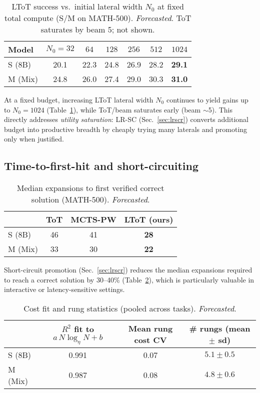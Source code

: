 \documentclass{article}
\begin{document}
\begin{table}[t]
\centering
\caption{LToT success vs.\ initial lateral width $N_0$ at fixed total compute (S/M on MATH-500). \emph{Forecasted}. ToT saturates by beam 5; not shown.}
\vspace{0.3em}
\begin{tabular}{lcccccc}
\toprule
\textbf{Model} & $N_0{=}32$ & $64$ & $128$ & $256$ & $512$ & $1024$ \\
\midrule
S (8B)   & 20.1 & 22.3 & 24.8 & 26.9 & 28.2 & \textbf{29.1} \\
M (Mix)  & 24.8 & 26.0 & 27.4 & 29.0 & 30.3 & \textbf{31.0} \\
\bottomrule
\end{tabular}
\label{tab:width-scaling}
\end{table}

At a fixed budget, increasing LToT lateral width $N_0$ continues to yield gains up to $N_0{=}1024$ (Table~\ref{tab:width-scaling}), while ToT/beam saturates early (beam $\sim$5).
This directly addresses \emph{utility saturation}: LR-SC (Sec.~\ref{sec:lrscr}) converts additional budget into productive breadth by cheaply trying many laterals and promoting only when justified.

\subsection{Time-to-first-hit and short-circuiting}
\label{subsec:ttfh}

\begin{table}[t]
\centering
\caption{Median expansions to first verified correct solution (MATH-500). \emph{Forecasted}.}
\vspace{0.3em}
\begin{tabular}{lccc}
\toprule
 & \textbf{ToT} & \textbf{MCTS-PW} & \textbf{LToT (ours)} \\
\midrule
S (8B)  & 46  & 41  & \textbf{28} \\
M (Mix) & 33  & 30  & \textbf{22} \\
\bottomrule
\end{tabular}
\label{tab:ttfh}
\end{table}

Short-circuit promotion (Sec.~\ref{sec:lrscr}) reduces the median expansions required to reach a correct solution by 30--40\% (Table~\ref{tab:ttfh}), which is particularly valuable in interactive or latency-sensitive settings.

\begin{table}[t]
\centering
\caption{Cost fit and rung statistics (pooled across tasks). \emph{Forecasted}.}
\vspace{0.3em}
\begin{tabular}{lccc}
\toprule
 & \textbf{$R^2$ fit to $a\,N\log_\eta N{+}b$} & \textbf{Mean rung cost CV} & \textbf{\# rungs (mean $\pm$ sd)} \\
\midrule
S (8B)  & 0.991 & 0.07 & $5.1 \pm 0.5$ \\
M (Mix) & 0.987 & 0.08 & $4.8 \pm 0.6$ \\
\bottomrule
\end{tabular}
\label{tab:cost-fit}
\end{table}
\end{document}
